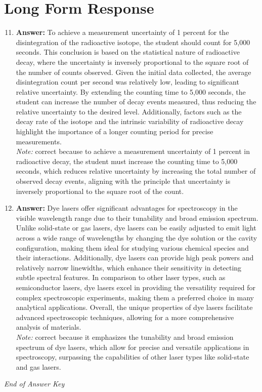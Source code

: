 \documentclass[12pt]{article}
\begin{document}
\section*{Long Form Response}
\begin{enumerate}[label=\arabic*.]
\setcounter{enumi}{10}
\item \textbf{Answer:} To achieve a measurement uncertainty of 1 percent for the disintegration of the radioactive isotope, the student should count for 5,000 seconds. This conclusion is based on the statistical nature of radioactive decay, where the uncertainty is inversely proportional to the square root of the number of counts observed. Given the initial data collected, the average disintegration count per second was relatively low, leading to significant relative uncertainty. By extending the counting time to 5,000 seconds, the student can increase the number of decay events measured, thus reducing the relative uncertainty to the desired level. Additionally, factors such as the decay rate of the isotope and the intrinsic variability of radioactive decay highlight the importance of a longer counting period for precise measurements.
\\ \textit{Note:} correct because to achieve a measurement uncertainty of 1 percent in radioactive decay, the student must increase the counting time to 5,000 seconds, which reduces relative uncertainty by increasing the total number of observed decay events, aligning with the principle that uncertainty is inversely proportional to the square root of the count.
\item \textbf{Answer:} Dye lasers offer significant advantages for spectroscopy in the visible wavelength range due to their tunability and broad emission spectrum. Unlike solid-state or gas lasers, dye lasers can be easily adjusted to emit light across a wide range of wavelengths by changing the dye solution or the cavity configuration, making them ideal for studying various chemical species and their interactions. Additionally, dye lasers can provide high peak powers and relatively narrow linewidths, which enhance their sensitivity in detecting subtle spectral features. In comparison to other laser types, such as semiconductor lasers, dye lasers excel in providing the versatility required for complex spectroscopic experiments, making them a preferred choice in many analytical applications. Overall, the unique properties of dye lasers facilitate advanced spectroscopic techniques, allowing for a more comprehensive analysis of materials.
\\ \textit{Note:} correct because it emphasizes the tunability and broad emission spectrum of dye lasers, which allow for precise and versatile applications in spectroscopy, surpassing the capabilities of other laser types like solid-state and gas lasers.
\end{enumerate}

\vfill
\noindent\textit{End of Answer Key}
\end{document}
